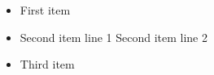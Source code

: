 \begin{itemize}
\item
First item
\item
Second item line 1
Second item line 2
\item
Third item
\end{itemize}
